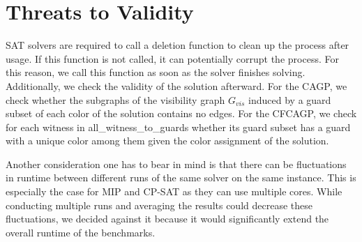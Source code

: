 \section{Threats to Validity}
SAT solvers are required to call a deletion function to clean up the process after usage. If this function is not called, it can potentially corrupt the process. For this reason, we call this function as soon as the solver finishes solving. Additionally, we check the validity of the solution afterward. For the CAGP, we check whether the subgraphs of the visibility graph $G_{vis}$ induced by a guard subset of each color of the solution contains no edges. For the CFCAGP, we check for each witness in all\_witness\_to\_guards whether its guard subset has a guard with a unique color among them given the color assignment of the solution.

Another consideration one has to bear in mind is that there can be fluctuations in runtime between different runs of the same solver on the same instance. This is especially the case for MIP and CP-SAT as they can use multiple cores. While conducting multiple runs and averaging the results could decrease these fluctuations, we decided against it because it would significantly extend the overall runtime of the benchmarks.